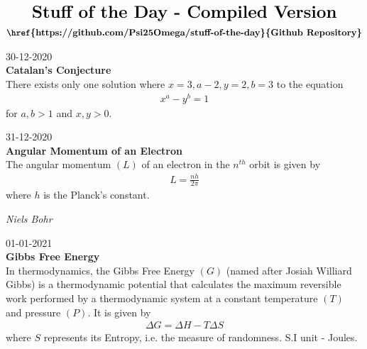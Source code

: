 \documentclass{article}
\begin{document}
\begin{align*}
    \LARGE\textbf{Stuff of the Day - Compiled Version}
\end{align*}
\begin{align*}
\textbf{\href{https://github.com/Psi25Omega/stuff-of-the-day}{Github Repository}}
\end{align*}
%
%
\begin{tcolorbox}[width=5in,sharp corners]
30-12-2020\\ 
\textbf{Catalan's Conjecture}\\ 
There exists only one solution where $x=3, a-2, y=2, b=3$ to the equation 
\begin{align*} 
    x^a - y^b = 1 
\end{align*} 
for $a,b > 1$ and $x,y > 0$.
\end{tcolorbox}
%
\begin{tcolorbox}[width=5in,sharp corners]
31-12-2020\\ 
\textbf{Angular Momentum of an Electron}\\ 
The angular momentum $(L)$ of an electron in the $n^{th}$ orbit is given by 
\begin{align*} 
    L = \frac{nh}{2\pi} 
\end{align*} where $h$ is the Planck's constant. 
\begin{flushright} \textit{Niels Bohr} \end{flushright}
\end{tcolorbox}
%
\begin{tcolorbox}[width=5in,sharp corners]
01-01-2021\\ 
\textbf{Gibbs Free Energy}\\ 
In thermodynamics, the Gibbs Free Energy $(G)$ (named after Josiah Williard Gibbs) is a thermodynamic potential that calculates the maximum reversible work  performed by a thermodynamic system at a constant temperature $(T)$ and pressure $(P)$. It is given by 
\begin{align*} 
    \Delta G=\Delta H-T\Delta S 
\end{align*} where $S$ represents its Entropy, i.e. the measure of randomness. S.I unit - Joules.
\end{tcolorbox}
%
\end{document}
